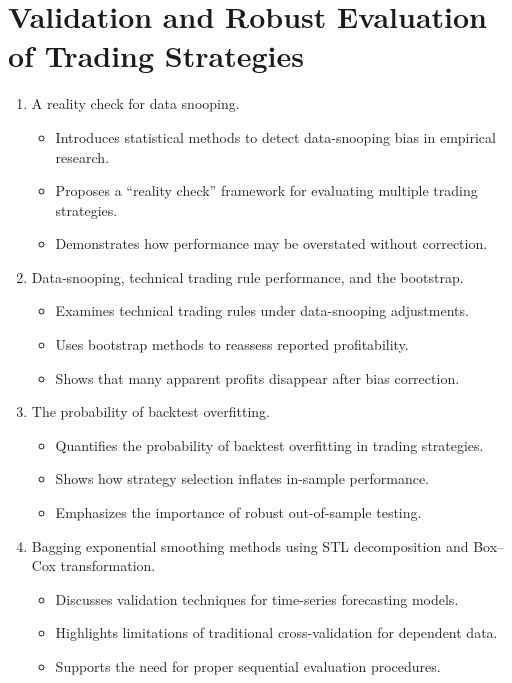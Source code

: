 \section{Validation and Robust Evaluation of Trading Strategies}
    \begin{enumerate}
    
        \item A reality check for data snooping.
        \cite {white2000reality}

        \begin{itemize}
        \item Introduces statistical methods to detect data-snooping bias in empirical research.
        \item Proposes a “reality check” framework for evaluating multiple trading strategies.
        \item Demonstrates how performance may be overstated without correction.
        \end{itemize}
        
        \item Data‐snooping, technical trading rule performance, and the bootstrap.
        \cite{sullivan1999data}

        \begin{itemize}
        \item Examines technical trading rules under data-snooping adjustments.
        \item Uses bootstrap methods to reassess reported profitability.
        \item Shows that many apparent profits disappear after bias correction.
        \end{itemize}
        
        \item The probability of backtest overfitting.
        \cite{bailey2017probability}

        \begin{itemize}
        \item Quantifies the probability of backtest overfitting in trading strategies.
        \item Shows how strategy selection inflates in-sample performance.
        \item Emphasizes the importance of robust out-of-sample testing.
        \end{itemize}
        
        \item Bagging exponential smoothing methods using STL decomposition and Box–Cox transformation.
        \cite{bergmeir2016bagging}

        \begin{itemize}
        \item Discusses validation techniques for time-series forecasting models.
        \item Highlights limitations of traditional cross-validation for dependent data.
        \item Supports the need for proper sequential evaluation procedures.
        \end{itemize}
        
    \end{enumerate}


